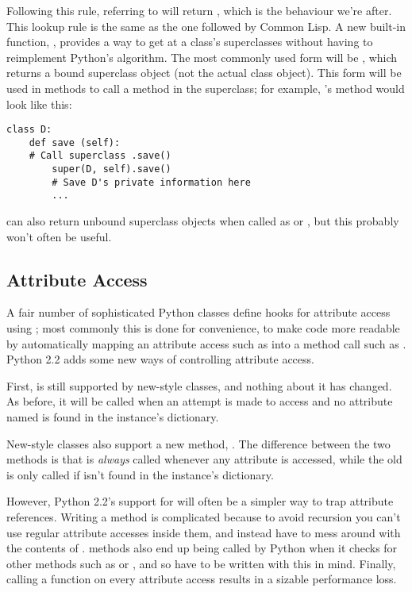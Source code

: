\documentclass{howto}
\begin{document}
Following this rule, referring to  will return
, which is the behaviour we're after.  This lookup
rule is the same as the one followed by Common Lisp.  A new built-in
function, , provides a way to get at a class's
superclasses without having to reimplement Python's algorithm.
The most commonly used form will be 
, which returns 
a bound superclass object (not the actual class object).  This form
will be used in methods to call a method in the superclass; for
example, 's  method would look like this:

\begin{verbatim}
class D:
    def save (self):
	# Call superclass .save()
        super(D, self).save()
        # Save D's private information here
        ...
\end{verbatim}

 can also return unbound superclass objects
when called as  or
, but this probably won't
often be useful.


\subsection{Attribute Access}

A fair number of sophisticated Python classes define hooks for
attribute access using ; most commonly this is
done for convenience, to make code more readable by automatically
mapping an attribute access such as  into a method
call such as .  Python 2.2 adds some new ways
of controlling attribute access.

First,  is still supported by
new-style classes, and nothing about it has changed.  As before, it
will be called when an attempt is made to access  and no
attribute named  is found in the instance's dictionary.

New-style classes also support a new method,
.  The difference between
the two methods is that  is \emph{always}
called whenever any attribute is accessed, while the old
 is only called if  isn't found in the
instance's dictionary.

However, Python 2.2's support for  will often be a
simpler way to trap attribute references.  Writing a
 method is complicated because to avoid recursion
you can't use regular attribute accesses inside them, and instead have
to mess around with the contents of .
 methods also end up being called by Python when
it checks for other methods such as  or
, and so have to be written with this in mind.
Finally, calling a function on every attribute access results in a
sizable performance loss.
\end{document}
